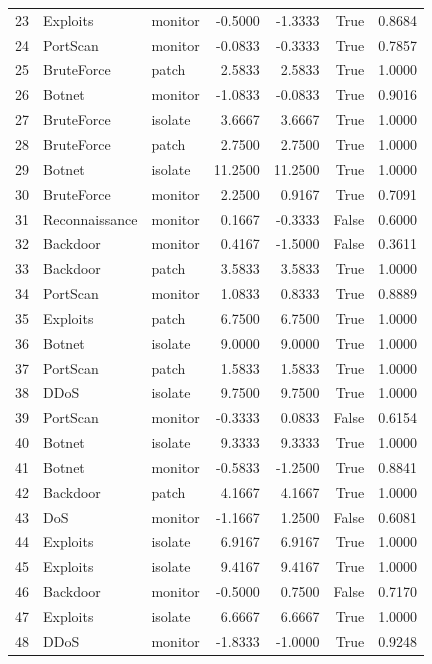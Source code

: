 \begin{table}
\begin{tabular}{rllrrrr}
23 & Exploits & monitor & -0.5000 & -1.3333 & True & 0.8684 \\
24 & PortScan & monitor & -0.0833 & -0.3333 & True & 0.7857 \\
25 & BruteForce & patch & 2.5833 & 2.5833 & True & 1.0000 \\
26 & Botnet & monitor & -1.0833 & -0.0833 & True & 0.9016 \\
27 & BruteForce & isolate & 3.6667 & 3.6667 & True & 1.0000 \\
28 & BruteForce & patch & 2.7500 & 2.7500 & True & 1.0000 \\
29 & Botnet & isolate & 11.2500 & 11.2500 & True & 1.0000 \\
30 & BruteForce & monitor & 2.2500 & 0.9167 & True & 0.7091 \\
31 & Reconnaissance & monitor & 0.1667 & -0.3333 & False & 0.6000 \\
32 & Backdoor & monitor & 0.4167 & -1.5000 & False & 0.3611 \\
33 & Backdoor & patch & 3.5833 & 3.5833 & True & 1.0000 \\
34 & PortScan & monitor & 1.0833 & 0.8333 & True & 0.8889 \\
35 & Exploits & patch & 6.7500 & 6.7500 & True & 1.0000 \\
36 & Botnet & isolate & 9.0000 & 9.0000 & True & 1.0000 \\
37 & PortScan & patch & 1.5833 & 1.5833 & True & 1.0000 \\
38 & DDoS & isolate & 9.7500 & 9.7500 & True & 1.0000 \\
39 & PortScan & monitor & -0.3333 & 0.0833 & False & 0.6154 \\
40 & Botnet & isolate & 9.3333 & 9.3333 & True & 1.0000 \\
41 & Botnet & monitor & -0.5833 & -1.2500 & True & 0.8841 \\
42 & Backdoor & patch & 4.1667 & 4.1667 & True & 1.0000 \\
43 & DoS & monitor & -1.1667 & 1.2500 & False & 0.6081 \\
44 & Exploits & isolate & 6.9167 & 6.9167 & True & 1.0000 \\
45 & Exploits & isolate & 9.4167 & 9.4167 & True & 1.0000 \\
46 & Backdoor & monitor & -0.5000 & 0.7500 & False & 0.7170 \\
47 & Exploits & isolate & 6.6667 & 6.6667 & True & 1.0000 \\
48 & DDoS & monitor & -1.8333 & -1.0000 & True & 0.9248 \\

\end{tabular}
\end{table}
